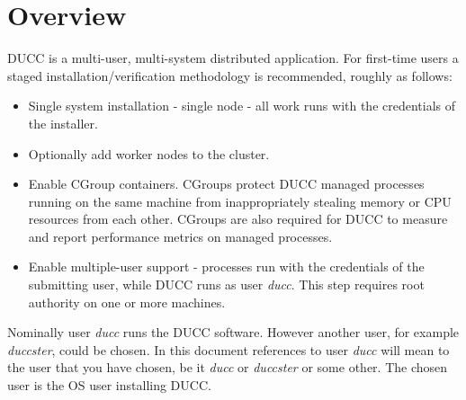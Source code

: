 % 
% 
% 
% 
\section{Overview}

DUCC is a multi-user, multi-system distributed application.
For first-time users a staged installation/verification methodology is recommended,
roughly as follows:

\begin{itemize}
    \item Single system installation - single node - all work runs with the credentials of the installer.
      
    \item Optionally add worker nodes to the cluster. 
      
    \item Enable CGroup containers. CGroups protect DUCC managed processes running on the same machine from inappropriately 
      stealing memory or CPU resources from each other. CGroups are also required for DUCC to measure and report
      performance metrics on managed processes.  
      
    \item Enable multiple-user support - processes run with the credentials of the submitting user,
      while DUCC runs as user {\em ducc}.
      This step requires root authority on one or more machines.
\end{itemize}

Nominally user {\em ducc} runs the DUCC software.  However another user, for example 
{\em duccster}, could be chosen.  In this document references to user {\em ducc} will mean 
to the user that you have chosen, be it {\em ducc} or {\em duccster} or some other.
The chosen user is the OS user installing DUCC.

